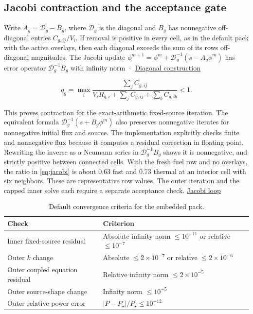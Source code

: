 \documentclass[11pt,letterpaper]{article}
\begin{document}
\subsection{Jacobi contraction and the acceptance
gate}\label{jacobi-contraction-and-the-acceptance-gate}

Write \(A_g=\mathcal D_g-B_g\), where \(\mathcal D_g\) is the diagonal and \(B_g\) has
nonnegative off-diagonal entries \(C_{g,ij}/V_i\). If removal is positive in every cell,
as in the default pack with the active overlays, then each diagonal exceeds the sum of
its row\textquotesingle s off-diagonal magnitudes. The Jacobi update
\(\phi^{m+1}=\phi^m+\mathcal D_g^{-1}(s-A_g\phi^m)\) has error operator
\(\mathcal D_g^{-1}B_g\) with infinity norm \cite{ref-5} ·
\href{https://github.com/hkkho/CRS/blob/4341ae8881f5827988c3d8b1859aa9e8f13cd8a6/src/ReactorSim.Core/Domain/SpatialEigenIterationContracts.cs\#L907}{Diagonal
construction}

\begin{equation}
\label{eq:jacobi}
q_g=\max_i
\frac{\sum_j C_{g,ij}}
{V_iR_{g,i}+\sum_j C_{g,ij}+\sum_b C_{g,ib}}<1 .
\end{equation}

This proves contraction for the exact-arithmetic fixed-source iteration. The equivalent
formula \(\mathcal D_g^{-1}(s+B_g\phi^m)\) also preserves nonnegative iterates for
nonnegative initial flux and source. The implementation explicitly checks finite and
nonnegative flux because it computes a residual correction in floating point. Rewriting
the inverse as a Neumann series in \(\mathcal D_g^{-1}B_g\) shows it is nonnegative, and
strictly positive between connected cells. With the fresh fuel row and no overlays, the
ratio in \eqref{eq:jacobi} is about 0.63 fast and 0.73 thermal at an interior cell with
six neighbors. These are representative row values. The outer iteration and the capped
inner solve each require a separate acceptance check.
\href{https://github.com/hkkho/CRS/blob/4341ae8881f5827988c3d8b1859aa9e8f13cd8a6/src/ReactorSim.Core/Domain/SpatialEigenIterationContracts.cs\#L681}{Jacobi
loop}

\begin{table}[!htbp]
\centering
\caption{Default convergence criteria for the embedded pack.}
\label{tab:convergence}
\small
\begin{tabularx}{\linewidth}{@{}lX@{}}
\toprule
Check & Criterion \\
\midrule
Inner fixed-source residual & Absolute infinity norm \(\le 10^{-11}\) or relative
  \(\le 10^{-7}\) \\
Outer \(k\) change & Absolute \(\le 2\times10^{-7}\) or relative
  \(\le 2\times10^{-6}\) \\
Outer coupled equation residual & Relative infinity norm \(\le 2\times10^{-5}\) \\
Outer source-shape change & Infinity norm \(\le 10^{-5}\) \\
Outer relative power error & \(\lvert P-P_\star\rvert/P_\star \le 10^{-12}\) \\
\bottomrule
\end{tabularx}
\end{table}
\end{document}
